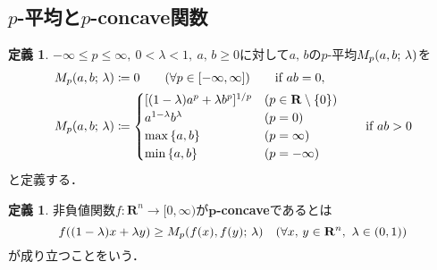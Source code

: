 \documentclass[a4j]{ltjsarticle}
\newcommand{\Rset}{\mathbf{R}}
\newcommand{\1}{\bm{1}}
\newcommand{\M}[4]{M_{#1}\qty(#2,#3;\,#4)}
\numberwithin{equation}{section}
\theoremstyle{definition}
\newtheorem{dfn}[thm]{定義}
\begin{document}
\subsection{\texorpdfstring{$p$}{TEXT}-平均と\texorpdfstring{$p$}{TEXT}-concave関数}
\begin{dfn}
    $-\infty\leq p\leq \infty,\ 0<\lambda<1,\ a,\,b\geq0$に対して$a,\,b$の$p$-平均$\M{p}{a}{b}{\lambda}$を
    \begin{align}
        \M{p}{a}{b}{\lambda}&\coloneqq 0\quad\quad(\forall p\in [-\infty,\infty]) \quad\quad \text{if $ab=0$},\\
        \M{p}{a}{b}{\lambda}&\coloneqq \begin{cases}
            [(1-\lambda)a^p+\lambda b^p]^{1/p} & (p\in \Rset\setminus\qty{0})\\
            a^{1-\lambda}b^\lambda & (p=0)\\
            \max\qty{a,b} & (p=\infty)\\
            \min\qty{a,b} & (p=-\infty)
        \end{cases}\quad\quad \text{if $ab>0$}
    \end{align}
    と定義する．
\end{dfn}
\begin{dfn}
    非負値関数$f\colon \Rset^n\to[0,\infty)$が$\bm{p}$\textbf{-concave}であるとは
    \begin{equation}
        f((1-\lambda)x+\lambda y)\geq \M{p}{f(x)}{f(y)}{\lambda}\quad (\forall x,\,y\in\Rset^n,\ \lambda\in(0,1))
    \end{equation}
    が成り立つことをいう．
\end{dfn}
\end{document}
